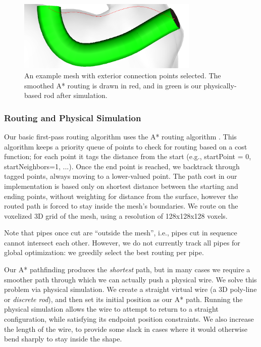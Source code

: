 \begin{figure}[h!]
\centering
    \includegraphics[width=3.4in]{figures/exterior.png}
\caption{An example mesh with exterior connection points selected.  The smoothed A* routing is drawn in {\color{red}red}, and in {\color{tovi}green} is our physically-based rod after simulation.}
\label{fig:tool-process-exterior}
\end{figure}

\subsubsection{Routing and Physical Simulation}

Our basic first-pass routing algorithm uses the A* routing algorithm \cite{Hart-Astar}.  This algorithm keeps a priority queue of points to check for routing based on a cost function; for each point it tags the distance from the start (e.g., startPoint = 0, startNeighbors=1, ...).  Once the end point is reached, we backtrack through tagged points, always moving to a lower-valued point.  The path cost in our implementation is based only on shortest distance between the starting and ending points, without weighting for distance from the surface, however the routed path is forced to stay inside the mesh's boundaries.  We route on the voxelized 3D grid of the mesh, using a resolution of 128x128x128 voxels. 

Note that pipes once cut are ``outside the mesh'', i.e., pipes cut in sequence cannot intersect each other.  However, we do not currently track all pipes for global optimization: we greedily select the best routing per pipe.

Our A* pathfinding produces the \emph{shortest} path, but in many cases
we require a smoother path through which we can actually push a physical wire.
We solve this problem via physical simulation. We create a straight virtual 
wire (a 3D poly-line or \emph{discrete rod}), and then set its initial position 
as our A* path.
Running the physical simulation allows the wire to attempt to return to
a straight configuration, while satisfying its endpoint position constraints.
We also increase the length of the wire, to provide some slack in cases where 
it would otherwise bend sharply to stay inside the shape. 

